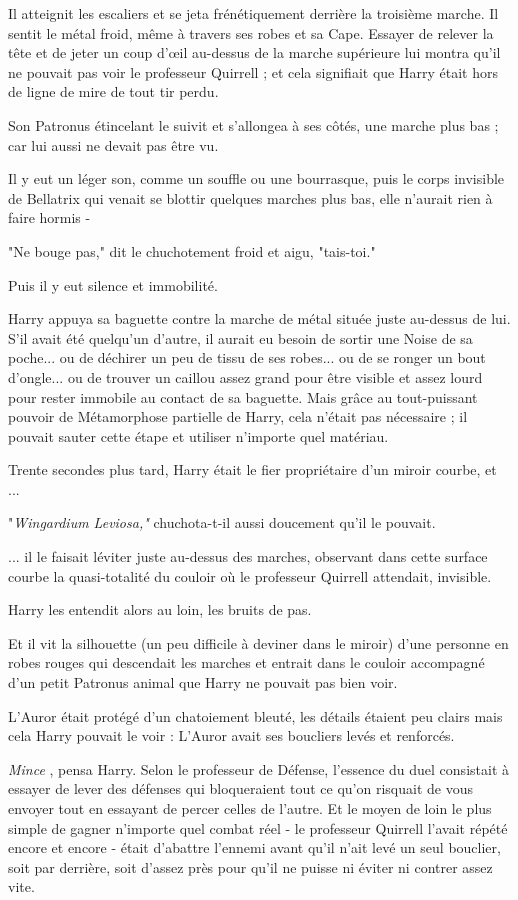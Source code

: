 Il atteignit les escaliers et se jeta frénétiquement derrière la troisième marche. Il sentit le métal froid, même à travers ses robes et sa Cape. Essayer de relever la tête et de jeter un coup d'œil au-dessus de la marche supérieure lui montra qu'il ne pouvait pas voir le professeur Quirrell ; et cela signifiait que Harry était hors de ligne de mire de tout tir perdu.

Son Patronus étincelant le suivit et s'allongea à ses côtés, une marche plus bas ; car lui aussi ne devait pas être vu.

Il y eut un léger son, comme un souffle ou une bourrasque, puis le corps invisible de Bellatrix qui venait se blottir quelques marches plus bas, elle n'aurait rien à faire hormis -

"Ne bouge pas," dit le chuchotement froid et aigu, "tais-toi."

Puis il y eut silence et immobilité.

Harry appuya sa baguette contre la marche de métal située juste au-dessus de lui. S'il avait été quelqu'un d'autre, il aurait eu besoin de sortir une Noise de sa poche... ou de déchirer un peu de tissu de ses robes... ou de se ronger un bout d'ongle... ou de trouver un caillou assez grand pour être visible et assez lourd pour rester immobile au contact de sa baguette. Mais grâce au tout-puissant pouvoir de Métamorphose partielle de Harry, cela n'était pas nécessaire ; il pouvait sauter cette étape et utiliser n'importe quel matériau.

Trente secondes plus tard, Harry était le fier propriétaire d'un miroir courbe, et ...

"\emph{Wingardium Leviosa,"}  chuchota-t-il aussi doucement qu'il le pouvait.

... il le faisait léviter juste au-dessus des marches, observant dans cette surface courbe la quasi-totalité du couloir où le professeur Quirrell attendait, invisible.

Harry les entendit alors au loin, les bruits de pas.

Et il vit la silhouette (un peu difficile à deviner dans le miroir) d'une personne en robes rouges qui descendait les marches et entrait dans le couloir accompagné d'un petit Patronus animal que Harry ne pouvait pas bien voir.

L'Auror était protégé d'un chatoiement bleuté, les détails étaient peu clairs mais cela Harry pouvait le voir : L'Auror avait ses boucliers levés et renforcés.

\emph{Mince} , pensa Harry. Selon le professeur de Défense, l'essence du duel consistait à essayer de lever des défenses qui bloqueraient tout ce qu'on risquait de vous envoyer tout en essayant de percer celles de l'autre. Et le moyen de loin le plus simple de gagner n'importe quel combat réel - le professeur Quirrell l'avait répété encore et encore - était d'abattre l'ennemi avant qu'il n'ait levé un seul bouclier, soit par derrière, soit d'assez près pour qu'il ne puisse ni éviter ni contrer assez vite.

